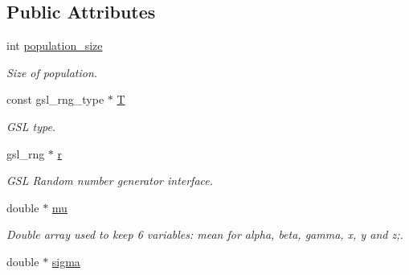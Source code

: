 \subsection*{Public Attributes}
\begin{DoxyCompactItemize}
\item 
\hypertarget{classDeal_a94b3deb88235446e08a13d12103fc441}{
int \hyperlink{classDeal_a94b3deb88235446e08a13d12103fc441}{population\_\-size}}
\label{classDeal_a94b3deb88235446e08a13d12103fc441}

\begin{DoxyCompactList}\small\item\em Size of population. \item\end{DoxyCompactList}\item 
\hypertarget{classDeal_ad3f7ad66c44e737d0c02c99c1eb017b6}{
const gsl\_\-rng\_\-type $\ast$ \hyperlink{classDeal_ad3f7ad66c44e737d0c02c99c1eb017b6}{T}}
\label{classDeal_ad3f7ad66c44e737d0c02c99c1eb017b6}

\begin{DoxyCompactList}\small\item\em GSL type. \item\end{DoxyCompactList}\item 
\hypertarget{classDeal_a16ff5bce803143e1f731618c0df7dcf6}{
gsl\_\-rng $\ast$ \hyperlink{classDeal_a16ff5bce803143e1f731618c0df7dcf6}{r}}
\label{classDeal_a16ff5bce803143e1f731618c0df7dcf6}

\begin{DoxyCompactList}\small\item\em GSL Random number generator interface. \item\end{DoxyCompactList}\item 
\hypertarget{classDeal_a3ebd25a0952e605a7ba348081ca02dff}{
double $\ast$ \hyperlink{classDeal_a3ebd25a0952e605a7ba348081ca02dff}{mu}}
\label{classDeal_a3ebd25a0952e605a7ba348081ca02dff}

\begin{DoxyCompactList}\small\item\em Double array used to keep 6 variables: mean for alpha, beta, gamma, x, y and z;. \item\end{DoxyCompactList}\item 
\hypertarget{classDeal_a7f25c3c7056763a79c9e6924c36fc4fe}{
double $\ast$ \hyperlink{classDeal_a7f25c3c7056763a79c9e6924c36fc4fe}{sigma}}
\label{classDeal_a7f25c3c7056763a79c9e6924c36fc4fe}


\end{DoxyCompactItemize}
